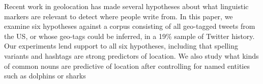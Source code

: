 Recent work in geolocation has made several hypotheses about what linguistic markers are relevant to detect where people write from. In this paper, we examine six hypotheses against a corpus consisting of all geo-tagged tweets from the US, or whose geo-tags could be inferred, in a 19\% sample of Twitter history. Our experiments lend support to all six hypotheses, including that spelling variants and hashtags are strong predictors of location. We also study what kinds of common nouns are predictive of location after controlling for named entities such as dolphins or sharks
